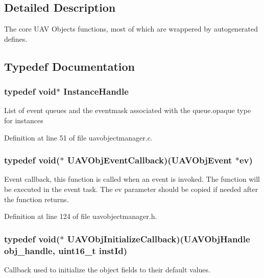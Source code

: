 \subsection{Detailed Description}
The core U\-A\-V Objects functions, most of which are wrappered by autogenerated defines. 

\subsection{Typedef Documentation}
\hypertarget{group___u_a_v_gabd5387dedf4d32f408b532b19fcdc1da}{
\subsubsection[{Instance\-Handle}]{\setlength{\rightskip}{0pt plus 5cm}typedef {\bf void}$\ast$ {\bf Instance\-Handle}}}\label{group___u_a_v_gabd5387dedf4d32f408b532b19fcdc1da}
List of event queues and the eventmask associated with the queue.\-opaque type for instances 

Definition at line 51 of file uavobjectmanager.\-c.

\hypertarget{group___u_a_v_ga33d11560e38b56dc904220fb0f785c28}{
\subsubsection[{U\-A\-V\-Obj\-Event\-Callback}]{\setlength{\rightskip}{0pt plus 5cm}typedef {\bf void}($\ast$ U\-A\-V\-Obj\-Event\-Callback)({\bf U\-A\-V\-Obj\-Event} $\ast$ev)}}\label{group___u_a_v_ga33d11560e38b56dc904220fb0f785c28}
Event callback, this function is called when an event is invoked. The function will be executed in the event task. The ev parameter should be copied if needed after the function returns. 

Definition at line 124 of file uavobjectmanager.\-h.

\hypertarget{group___u_a_v_ga16def10911b9b7e8626c2d1e3fec6e67}{
\subsubsection[{U\-A\-V\-Obj\-Initialize\-Callback}]{\setlength{\rightskip}{0pt plus 5cm}typedef {\bf void}($\ast$ U\-A\-V\-Obj\-Initialize\-Callback)({\bf U\-A\-V\-Obj\-Handle} obj\-\_\-handle, {\bf uint16\-\_\-t} {\bf inst\-Id})}}\label{group___u_a_v_ga16def10911b9b7e8626c2d1e3fec6e67}
Callback used to initialize the object fields to their default values. 

